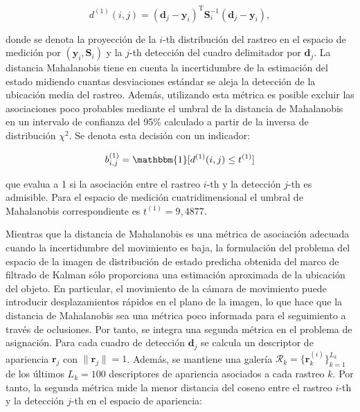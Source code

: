 \begin{equation}
\label{eq:equation1-deepsort}
d^{(1)} (i,j) = (\boldsymbol{d}_{j} - \boldsymbol{y}_{i})^{\text{T}} \boldsymbol{S}_{i}^{-1} (\boldsymbol{d}_{j} - \boldsymbol{y}_{i}),
\end{equation}

donde se denota la proyección de la $i$-th distribución del rastreo en el espacio de medición por $(\boldsymbol{y}_{i}, \boldsymbol{S}_{i})$ y la $j$-th detección del cuadro delimitador por $\boldsymbol{d}_{j}$. La distancia Mahalanobis tiene en cuenta la incertidumbre de la estimación del estado midiendo cuantas desviaciones estándar se aleja la detección de la ubicación media del rastreo. Además, utilizando esta métrica es posible excluir las asociaciones poco probables mediante el umbral de la distancia de Mahalanobis en un intervalo de confianza del 95\% calculado a partir de la inversa de distribución $\chi^{2}$. Se denota esta decisión con un indicador:

\begin{equation}
\label{eq:equation2-deepsort}
b_{i,j}^{(1)} = \mathbbm{1}[d^{(1)} (i,j) \leq t^{(1)}]
\end{equation}

que evalua a 1 si la asociación entre el rastreo $i$-th y la detección $j$-th es admisible. Para el espacio de medición cuatridimensional el umbral de Mahalanobis correspondiente es $t^{(1)} = 9,4877$.

Mientras que la distancia de Mahalanobis es una métrica de asociación adecuada cuando la incertidumbre del movimiento es baja, la formulación del problema del espacio de la imagen de distribución de estado predicha obtenida del marco de filtrado de Kalman sólo proporciona una estimación aproximada de la ubicación del objeto. En particular, el movimiento de la cámara de movimiento puede introducir desplazamientos rápidos en el plano de la imagen, lo que hace que la distancia de Mahalanobis sea una métrica poco informada para el seguimiento a través de oclusiones. Por tanto, se integra una segunda métrica en el problema de asignación. Para cada cuadro de detección $\boldsymbol{d}_{j}$ se calcula un descriptor de apariencia $\boldsymbol{r}_{j}$ con $\parallel \boldsymbol{r}_{j} \parallel = 1$. Además, se mantiene una galería $\mathcal{R}_{k} = \{\boldsymbol{r}_{k}^{(i)}\}_{k=1}^{L_{k}}$ de los últimos $L_{k} = 100$ descriptores de apariencia asociados a cada rastreo $k$. Por tanto, la segunda métrica mide la menor distancia del coseno entre el rastreo $i$-th y la detección $j$-th en el espacio de apariencia:

